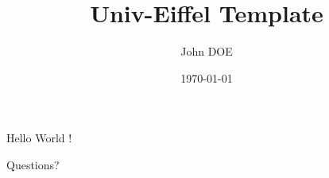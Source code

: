 \documentclass[aspectratio=169]{beamer}
\title[]{Univ-Eiffel Template}
\date[]{\today}
\author{John DOE}
\institute{Université Gustave Eiffel, INRIA, COSYS/SII, I4S, France}
\begin{document}
	\maketitle

	\begin{frame}{Hello}
		World !
	\end{frame}

	\begin{frame}
		Questions?
	\end{frame}
\end{document}
